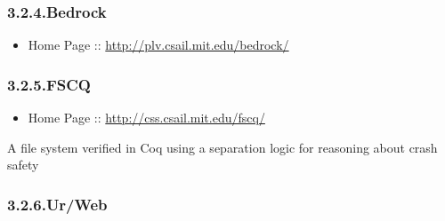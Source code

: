 \documentclass[12pt,twoside]{article}
\begin{document}
\subsubsection{3.2.4.\hspace*{0.5em}Bedrock}\label{sec-bedrock}%

\begin{itemize}[noitemsep,topsep=\mdcompacttopsep]%

\item{}Home Page :: \href{http://plv.csail.mit.edu/bedrock/}{{\ttfamily http://\hspace{0pt}plv.\hspace{0pt}csail.\hspace{0pt}mit.\hspace{0pt}edu/\hspace{0pt}bedrock/\hspace{0pt}}}%
\end{itemize}%

\subsubsection{3.2.5.\hspace*{0.5em}FSCQ}\label{sec-fscq}%

\begin{itemize}[noitemsep,topsep=\mdcompacttopsep]%

\item{}Home Page :: \href{http://css.csail.mit.edu/fscq/}{{\ttfamily http://\hspace{0pt}css.\hspace{0pt}csail.\hspace{0pt}mit.\hspace{0pt}edu/\hspace{0pt}fscq/\hspace{0pt}}}%
\end{itemize}%

\noindent{}A file system verified in Coq using a separation logic for reasoning about crash safety%

\subsubsection{3.2.6.\hspace*{0.5em}Ur/Web}\label{sec-urweb}%
\end{document}
